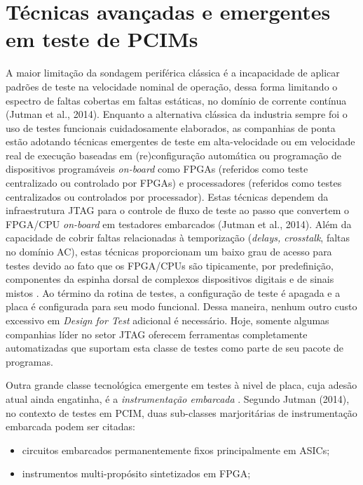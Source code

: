 \section{Técnicas avançadas e emergentes em teste de PCIMs}\label{advPCBA}

A maior limitação da sondagem periférica clássica é a incapacidade de aplicar padrões de teste na velocidade nominal de operação, dessa forma limitando o espectro de faltas cobertas em faltas estáticas, no domínio de corrente contínua (Jutman et al., 2014). Enquanto a alternativa clássica da industria sempre foi o uso de testes funcionais cuidadosamente elaborados, as companhias de ponta estão adotando técnicas emergentes de teste em alta-velocidade ou em velocidade real de execução baseadas em (re)configuração automática ou programação de dispositivos programáveis \textit{on-board} como FPGAs (referidos como teste centralizado \citep{aleksejev2013fpga} ou controlado \citep{jutman2014high} por FPGAs) e processadores (referidos como testes centralizados \citep{ehrenberg2009combining} ou controlados \citep{tsertov2011soc} por processador). Estas técnicas dependem da infraestrutura JTAG para o controle de fluxo de teste ao passo que convertem o FPGA/CPU \textit{on-board} em testadores embarcados (Jutman et al., 2014). Além da capacidade de cobrir faltas relacionadas à temporização (\textit{delays, crosstalk}, faltas no domínio AC), estas técnicas proporcionam um baixo grau de acesso para testes devido ao fato que os FPGA/CPUs são tipicamente, por predefinição, componentes da espinha dorsal de complexos dispositivos digitais e de sinais mistos \citep{6401571}. Ao término da rotina de testes, a configuração de teste é apagada e a placa é configurada para seu modo funcional. Dessa maneira, nenhum outro custo excessivo em \textit{Design for Test} adicional é necessário. Hoje, somente algumas companhias líder no setor JTAG oferecem ferramentas completamente automatizadas que suportam esta classe de testes como parte de seu pacote de programas.\par
Outra grande classe tecnológica emergente em testes à nivel de placa, cuja adesão atual ainda engatinha, é a \textit{instrumentação embarcada} \citep{embeddedinstrument}. Segundo Jutman (2014), no contexto de testes em PCIM, duas sub-classes marjoritárias de instrumentação embarcada podem ser citadas: 
\begin{itemize}
\item circuitos embarcados permanentemente fixos principalmente em ASICs;
\item instrumentos multi-propósito sintetizados em FPGA;
\end{itemize}

